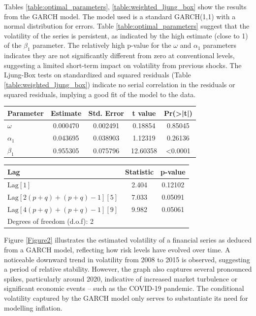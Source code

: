 \documentclass[11pt,preprint, authoryear]{elsarticle}
\let\origtable\table
\let\endorigtable\endtable
\renewenvironment{table}[1][2] {
    \expandafter\origtable\expandafter[H]
} {
    \endorigtable
}
\numberwithin{equation}{section}
\numberwithin{figure}{section}
\numberwithin{table}{section}
\begin{document}
Tables \ref{table:optimal_parameters}, \ref{table:weighted_ljung_box}
show the results from the GARCH model. The model used is a standard
GARCH(1,1) with a normal distribution for errors. Table
\ref{table:optimal_parameters} suggest that the volatility of the series
is persistent, as indicated by the high estimate (close to 1) of the
\(\beta_1\) parameter. The relatively high p-value for the \(\omega\)
and \(\alpha_1\) parameters indicates they are not significantly
different from zero at conventional levels, suggesting a limited
short-term impact on volatility from previous shocks. The Ljung-Box
tests on standardized and squared residuals (Table
\ref{table:weighted_ljung_box}) indicate no serial correlation in the
residuals or squared residuals, implying a good fit of the model to the
data.

\begin{table}[ht]
\centering
\caption{Optimal Parameters of GARCH Model}
\label{table:optimal_parameters}
\begin{tabular}{lcccc}
\hline
Parameter & Estimate & Std. Error & t value & Pr(>|t|) \\
\hline
\(\omega\)   & 0.000470 & 0.002491 & 0.18854 & 0.85045 \\
\(\alpha_1\)  & 0.043695 & 0.038903 & 1.12319 & 0.26136 \\
\(\beta_1\)   & 0.955305 & 0.075796 & 12.60358 & <0.0001 \\
\hline
\end{tabular}
\end{table}

\begin{table}[ht]
\centering
\caption{Weighted Ljung-Box Test on Standardized Squared Residuals}
\label{table:weighted_ljung_box}
\begin{tabular}{lcc}
\hline
Lag & Statistic & p-value \\
\hline
\( \text{Lag}[1] \) & 2.404 & 0.12102 \\
\( \text{Lag}[2(p+q)+(p+q)-1][5] \) & 7.033 & 0.05091 \\
\( \text{Lag}[4(p+q)+(p+q)-1][9] \) & 9.982 & 0.05061 \\
\hline
\multicolumn{3}{l}{Degrees of freedom (d.o.f): 2} \\
\hline
\end{tabular}
\end{table}

Figure \ref{Figure2} illustrates the estimated volatility of a financial
series as deduced from a GARCH model, reflecting how risk levels have
evolved over time. A noticeable downward trend in volatility from 2008
to 2015 is observed, suggesting a period of relative stability. However,
the graph also captures several pronounced spikes, particularly around
2020, indicative of increased market turbulence or significant economic
events -- such as the COVID-19 pandemic. The conditional volatility
captured by the GARCH model only serves to substantiate its need for
modelling inflation.
\end{document}
